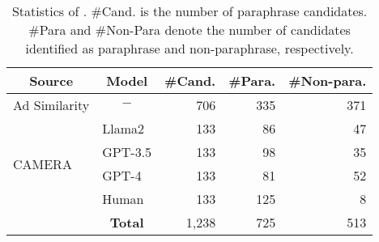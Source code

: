 \begin{table}[t]
\centering
{\small
\begin{tabular}{@{}l@{}l@{}r@{}r@{}r@{}} \toprule
\multicolumn{1}{c}{\textbf{Source}} & 
\multicolumn{1}{c}{\textbf{Model}} & 
\multicolumn{1}{c}{\textbf{\#Cand.}} & 
\multicolumn{1}{c}{\textbf{\#Para.}} & 
\multicolumn{1}{c}{\textbf{\#Non-para.}} \\ \midrule
Ad Similarity & \multicolumn{1}{c}{$-$} & 706 & 335 & 371 \\
\multirow{4}{*}{CAMERA} & Llama2 & 133 & 86 & 47 \\
& GPT-3.5 & 133 & 98 & 35 \\
& GPT-4 & 133 & 81 & 52 \\
& Human & 133 & 125 & 8 \\ \midrule
& \multicolumn{1}{c}{\textbf{Total}} & 1,238 & 725 & 513 \\ \bottomrule
\end{tabular}}
\caption{Statistics of \dataset. \#Cand. is the number of paraphrase candidates. \#Para and \#Non-Para denote the number of candidates identified as paraphrase and non-paraphrase, respectively.}\label{tab:paraphrase_dataset}
\end{table}